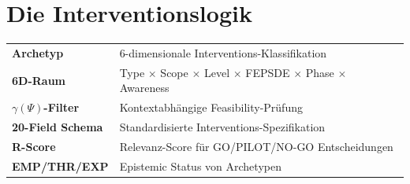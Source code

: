 %
%
%
%

\chapter{Die Interventionslogik}
\label{ch:intervention-logic}

\begin{tcolorbox}[colback=blue!5!white, colframe=blue!75!black,
    title=Zentrale Begriffe in diesem Kapitel]
\small
\begin{tabular}{@{}ll@{}}
\textbf{Archetyp} & 6-dimensionale Interventions-Klassifikation \\
\textbf{6D-Raum} & Type $\times$ Scope $\times$ Level $\times$ FEPSDE $\times$ Phase $\times$ Awareness \\
\textbf{$\gamma(\Psi)$-Filter} & Kontextabhängige Feasibility-Prüfung \\
\textbf{20-Field Schema} & Standardisierte Interventions-Spezifikation \\
\textbf{R-Score} & Relevanz-Score für GO/PILOT/NO-GO Entscheidungen \\
\textbf{EMP/THR/EXP} & Epistemic Status von Archetypen \\
\end{tabular}
\end{tcolorbox}

